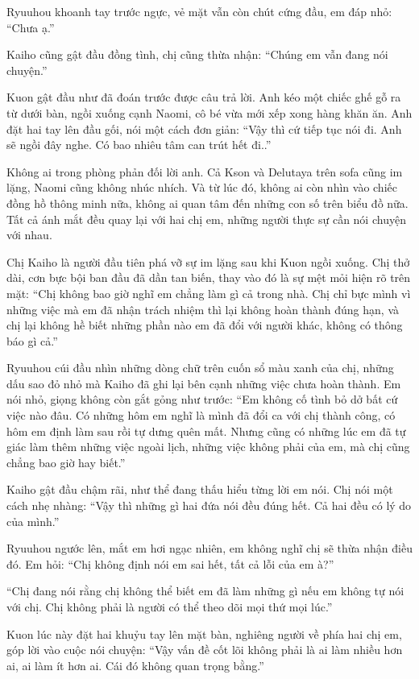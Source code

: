 \documentclass[../main.tex]{subfiles}
\begin{document}
Ryuuhou khoanh tay trước ngực, vẻ mặt vẫn còn chút cứng đầu, em đáp nhỏ: ``Chưa ạ.''

Kaiho cũng gật đầu đồng tình, chị cũng thừa nhận: ``Chúng em vẫn đang nói chuyện.''

Kuon gật đầu như đã đoán trước được câu trả lời. Anh kéo một chiếc ghế gỗ ra từ dưới bàn, ngồi xuống cạnh Naomi, cô bé vừa mới xếp xong hàng khăn ăn. Anh đặt hai tay lên đầu gối, nói một cách đơn giản: ``Vậy thì cứ tiếp tục nói đi. Anh sẽ ngồi đây nghe. Có bao nhiêu tâm can trút hết đi..''

Không ai trong phòng phản đối lời anh. Cả Kson và Delutaya trên sofa cũng im lặng, Naomi cũng không nhúc nhích. Và từ lúc đó, không ai còn nhìn vào chiếc đồng hồ thông minh nữa, không ai quan tâm đến những con số trên biểu đồ nữa. Tất cả ánh mắt đều quay lại với hai chị em, những người thực sự cần nói chuyện với nhau.

Chị Kaiho là người đầu tiên phá vỡ sự im lặng sau khi Kuon ngồi xuống. Chị thở dài, cơn bực bội ban đầu đã dần tan biến, thay vào đó là sự mệt mỏi hiện rõ trên mặt: ``Chị không bao giờ nghĩ em chẳng làm gì cả trong nhà. Chị chỉ bực mình vì những việc mà em đã nhận trách nhiệm thì lại không hoàn thành đúng hạn, và chị lại không hề biết những phần nào em đã đổi với người khác, không có thông báo gì cả.''

Ryuuhou cúi đầu nhìn những dòng chữ trên cuốn sổ màu xanh của chị, những dấu sao đỏ nhỏ mà Kaiho đã ghi lại bên cạnh những việc chưa hoàn thành. Em nói nhỏ, giọng không còn gắt gỏng như trước: ``Em không cố tình bỏ dở bất cứ việc nào đâu. Có những hôm em nghĩ là mình đã đổi ca với chị thành công, có hôm em định làm sau rồi tự dưng quên mất. Nhưng cũng có những lúc em đã tự giác làm thêm những việc ngoài lịch, những việc không phải của em, mà chị cũng chẳng bao giờ hay biết.''

Kaiho gật đầu chậm rãi, như thể đang thấu hiểu từng lời em nói. Chị nói một cách nhẹ nhàng: ``Vậy thì những gì hai đứa nói đều đúng hết. Cả hai đều có lý do của mình.''

Ryuuhou ngước lên, mắt em hơi ngạc nhiên, em không nghĩ chị sẽ thừa nhận điều đó. Em hỏi: ``Chị không định nói em sai hết, tất cả lỗi của em à?''

``Chị đang nói rằng chị không thể biết em đã làm những gì nếu em không tự nói với chị. Chị không phải là người có thể theo dõi mọi thứ mọi lúc.''

Kuon lúc này đặt hai khuỷu tay lên mặt bàn, nghiêng người về phía hai chị em, góp lời vào cuộc nói chuyện: ``Vậy vấn đề cốt lõi không phải là ai làm nhiều hơn ai, ai làm ít hơn ai. Cái đó không quan trọng bằng.''
\end{document}
